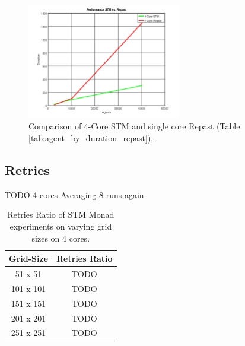 \begin{figure}
	\centering
	\includegraphics[width=0.6\textwidth, angle=0]{./fig/agents_duration_stm_repast.png}
	\caption{Comparison of 4-Core STM and single core Repast (Table \ref{tab:agent_by_duration_repast}).}
	\label{fig:agent_by_duration_repast}
\end{figure}

\subsection{Retries}
TODO
4 cores
Averaging 8 runs again

\begin{table}
	\centering
  	\begin{tabular}{ c || c  }
        Grid-Size & Retries Ratio \\ \hline \hline 
   		51 x 51   & TODO \\ \hline
   		101 x 101 & TODO \\ \hline
   		151 x 151 & TODO \\ \hline
   		201 x 201 & TODO \\ \hline 
   		251 x 251 & TODO \\ \hline
  	\end{tabular}
  	
  	\caption{Retries Ratio of STM Monad experiments on varying grid sizes on 4 cores.}
	\label{tab:retries_stm}
\end{table}


